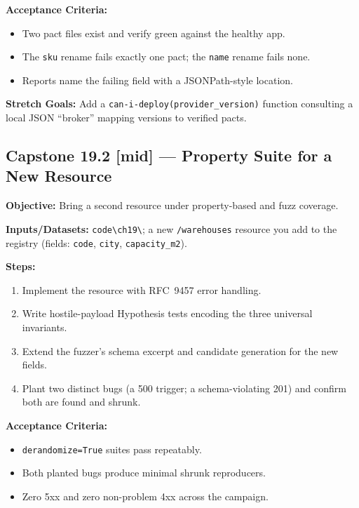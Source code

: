 \textbf{Acceptance Criteria:}
\begin{itemize}
  \item[$\square$] Two pact files exist and verify green against the
        healthy app.
  \item[$\square$] The \texttt{sku} rename fails exactly one pact; the
        \texttt{name} rename fails none.
  \item[$\square$] Reports name the failing field with a JSONPath-style
        location.
\end{itemize}

\textbf{Stretch Goals:} Add a \texttt{can-i-deploy(provider\_version)}
function consulting a local JSON ``broker'' mapping versions to verified
pacts.

\subsection*{Capstone 19.2 [mid] --- Property Suite for a New Resource}
\textbf{Objective:} Bring a second resource under property-based and fuzz
coverage.

\textbf{Inputs/Datasets:} \texttt{code\textbackslash{}ch19\textbackslash{}};
a new \texttt{/warehouses} resource you add to the registry (fields:
\texttt{code}, \texttt{city}, \texttt{capacity\_m2}).

\textbf{Steps:}
\begin{enumerate}
  \item Implement the resource with RFC~9457 error handling.
  \item Write hostile-payload Hypothesis tests encoding the three universal
        invariants.
  \item Extend the fuzzer's schema excerpt and candidate generation for the
        new fields.
  \item Plant two distinct bugs (a 500 trigger; a schema-violating 201) and
        confirm both are found and shrunk.
\end{enumerate}

\textbf{Acceptance Criteria:}
\begin{itemize}
  \item[$\square$] \texttt{derandomize=True} suites pass repeatably.
  \item[$\square$] Both planted bugs produce minimal shrunk reproducers.
  \item[$\square$] Zero 5xx and zero non-problem 4xx across the campaign.
\end{itemize}

